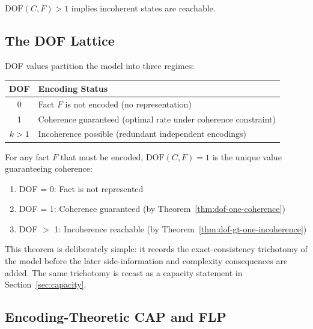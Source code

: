 \begin{corollary}\label{cor:dof-risk}
$\text{DOF}(C, F) > 1$ implies incoherent states are reachable.
\end{corollary}

\subsection{The DOF Lattice}\label{sec:dof-lattice}

DOF values partition the model into three regimes:

\begin{center}
\begin{tabularx}{\linewidth}{cX}
\toprule
\textbf{DOF} & \textbf{Encoding Status} \\
\midrule
0 & Fact $F$ is not encoded (no representation) \\
1 & Coherence guaranteed (optimal rate under coherence constraint) \\
$k > 1$ & Incoherence possible (redundant independent encodings) \\
\bottomrule
\end{tabularx}
\end{center}

\begin{theorem}[DOF = 1 is Uniquely Coherent]\label{thm:dof-optimal}
For any fact $F$ that must be encoded, $\text{DOF}(C, F) = 1$ is the unique value guaranteeing coherence:
\begin{enumerate}
\tightlist
\item DOF = 0: Fact is not represented
\item DOF = 1: Coherence guaranteed (by Theorem~\ref{thm:dof-one-coherence})
\item DOF $>$ 1: Incoherence reachable (by Theorem~\ref{thm:dof-gt-one-incoherence})
\end{enumerate}
This theorem is deliberately simple: it records the exact-consistency trichotomy of the model before the later side-information and complexity consequences are added. The same trichotomy is recast as a capacity statement in Section~\ref{sec:capacity}.
\end{theorem}

\subsection{Encoding-Theoretic CAP and FLP}\label{sec:cap-flp}

